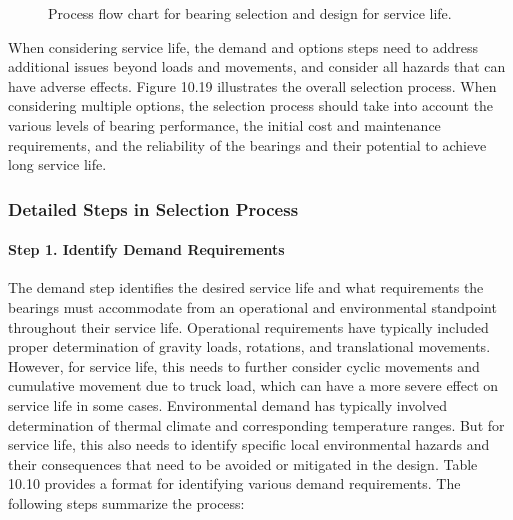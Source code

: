 \begin{figure}
  \caption{Process flow chart for bearing selection and design for service life.}
  \label{fig:flow-chart-bearing-selection}
\end{figure}

When considering service life, the demand and options steps need to address additional issues beyond loads and
movements, and consider all hazards that can have adverse effects. Figure 10.19 illustrates the overall selection
process. When considering multiple options, the selection process should take into account the various levels of
bearing performance, the initial cost and maintenance requirements, and the reliability of the bearings and their
potential to achieve long service life.



\subsubsection{Detailed Steps in Selection Process}

\paragraph*{Step 1. Identify Demand Requirements}
The demand step identifies the desired service life and what requirements the bearings must accommodate
from an operational and environmental standpoint throughout their service life. Operational requirements have
typically included proper determination of gravity loads, rotations, and translational movements. However, for
service life, this needs to further consider cyclic movements and cumulative movement due to truck load, which
can have a more severe effect on service life in some cases. Environmental demand has typically involved
determination of thermal climate and corresponding temperature ranges. But for service life, this also needs to
identify specific local environmental hazards and their consequences that need to be avoided or mitigated in the
design. Table 10.10 provides a format for identifying various demand requirements. The following steps
summarize the process:

